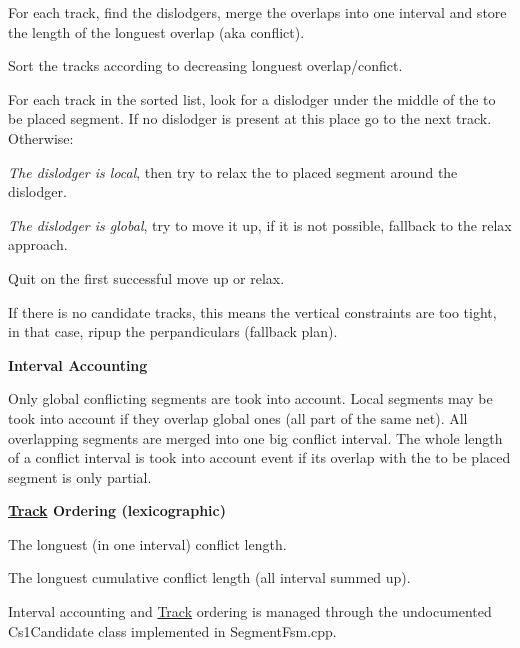 \begin{DoxyEnumerate}
\item For each track, find the dislodgers, merge the overlaps into one interval and store the length of the longuest overlap (aka conflict).
\item Sort the tracks according to decreasing longuest overlap/confict.
\item For each track in the sorted list, look for a dislodger under the middle of the to be placed segment. If no dislodger is present at this place go to the next track. Otherwise\+:
\begin{DoxyItemize}
\item {\itshape The dislodger is local}, then try to relax the to placed segment around the dislodger.
\item {\itshape The dislodger is global}, try to move it up, if it is not possible, fallback to the relax approach.
\end{DoxyItemize}
\item Quit on the first successful move up or relax.
\item If there is no candidate tracks, this means the vertical constraints are too tight, in that case, ripup the perpandiculars (fallback plan).
\end{DoxyEnumerate}

{\bfseries Interval Accounting}

Only global conflicting segments are took into account. Local segments may be took into account if they overlap global ones (all part of the same net). All overlapping segments are merged into one big conflict interval. The whole length of a conflict interval is took into account event if it\textquotesingle{}s overlap with the to be placed segment is only partial.

{\bfseries \mbox{\hyperlink{classKite_1_1Track}{Track}} Ordering (lexicographic)}


\begin{DoxyEnumerate}
\item The longuest (in one interval) conflict length.
\item The longuest cumulative conflict length (all interval summed up).
\end{DoxyEnumerate}

Interval accounting and \mbox{\hyperlink{classKite_1_1Track}{Track}} ordering is managed through the undocumented {\ttfamily Cs1\+Candidate} class implemented in {\ttfamily Segment\+Fsm.\+cpp}.

 \mbox{\label{classKite_1_1SegmentFsm_a0b8e8be9d7c9501be9534d3c2a9dd586}} 
